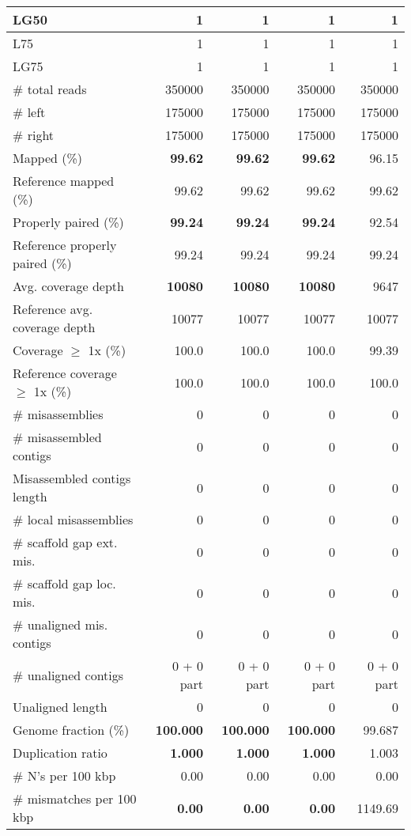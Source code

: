 \documentclass[12pt,a4paper]{article}
\begin{document}
\begin{table}[ht]
\begin{center}
\begin{tabular}{|l*{4}{|r}|}
LG50 & 1 & 1 & 1 & 1 \\ \hline
L75 & 1 & 1 & 1 & 1 \\ \hline
LG75 & 1 & 1 & 1 & 1 \\ \hline
\# total reads & 350000 & 350000 & 350000 & 350000 \\ \hline
\# left & 175000 & 175000 & 175000 & 175000 \\ \hline
\# right & 175000 & 175000 & 175000 & 175000 \\ \hline
Mapped (\%) & {\bf 99.62} & {\bf 99.62} & {\bf 99.62} & 96.15 \\ \hline
Reference mapped (\%) & 99.62 & 99.62 & 99.62 & 99.62 \\ \hline
Properly paired (\%) & {\bf 99.24} & {\bf 99.24} & {\bf 99.24} & 92.54 \\ \hline
Reference properly paired (\%) & 99.24 & 99.24 & 99.24 & 99.24 \\ \hline
Avg. coverage depth & {\bf 10080} & {\bf 10080} & {\bf 10080} & 9647 \\ \hline
Reference avg. coverage depth & 10077 & 10077 & 10077 & 10077 \\ \hline
Coverage $\geq$ 1x (\%) & 100.0 & 100.0 & 100.0 & 99.39 \\ \hline
Reference coverage $\geq$ 1x (\%) & 100.0 & 100.0 & 100.0 & 100.0 \\ \hline
\# misassemblies & 0 & 0 & 0 & 0 \\ \hline
\# misassembled contigs & 0 & 0 & 0 & 0 \\ \hline
Misassembled contigs length & 0 & 0 & 0 & 0 \\ \hline
\# local misassemblies & 0 & 0 & 0 & 0 \\ \hline
\# scaffold gap ext. mis. & 0 & 0 & 0 & 0 \\ \hline
\# scaffold gap loc. mis. & 0 & 0 & 0 & 0 \\ \hline
\# unaligned mis. contigs & 0 & 0 & 0 & 0 \\ \hline
\# unaligned contigs & 0 + 0 part & 0 + 0 part & 0 + 0 part & 0 + 0 part \\ \hline
Unaligned length & 0 & 0 & 0 & 0 \\ \hline
Genome fraction (\%) & {\bf 100.000} & {\bf 100.000} & {\bf 100.000} & 99.687 \\ \hline
Duplication ratio & {\bf 1.000} & {\bf 1.000} & {\bf 1.000} & 1.003 \\ \hline
\# N's per 100 kbp & 0.00 & 0.00 & 0.00 & 0.00 \\ \hline
\# mismatches per 100 kbp & {\bf 0.00} & {\bf 0.00} & {\bf 0.00} & 1149.69 \\ \hline

\end{tabular}
\end{center}
\end{table}
\end{document}
